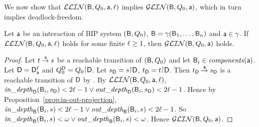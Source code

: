 \vspace{0.5ex}

\noindent
We now show that $\mathcal{LLIN}(\mathsf{B}, Q_0, \mathsf{a}, \ell)$ implies $\mathcal{GLIN}(\mathsf{B}, Q_0, \mathsf{a})$, which in turn implies deadlock-freedom.  

\begin{lemma}
\label{lemma:loc-implies-glob}
\label{lemma:locLinear-implies-globlinear}
\label{LLinGLin}
Let $\mathsf{a}$ be an interaction of BIP system $(\mathsf{B}, Q_0)$, \ie $\mathsf{B} = \gamma(\mathsf{B}_1,\dots,\mathsf{B}_n)$ and $\mathsf{a} \in \gamma$.
If $\mathcal{LLIN}(\mathsf{B}, Q_0, \mathsf{a}, \ell)$ holds for some finite $\ell \ge 1$, then $\mathcal{GLIN}(\mathsf{B}, Q_0, \mathsf{a})$ holds.
\end{lemma}
%
\begin{proof}
Let $t \stackrel{\mathsf{a}}{\rightarrow} s$ be a reachable transition of $(\mathsf{B}, Q_0)$ and let $\mathsf{B}_i \in \mathit{components}(\mathsf{a})$.
Let $\mathsf{D} = \mathsf{D}_{\mathsf{a}}^{\ell}$ and $\QDS = Q_0 \pj \DS$.
Let $\sD = s \pj \DS$, $\tD = t \pj \DS$.
Then $t_\mathsf{D} \stackrel{\mathsf{a}}{\rightarrow} s_\mathsf{D}$ is a reachable transition of $\mathsf{D}$ by .
By $\mathcal{LLIN}(\mathsf{B}, Q_0, \mathsf{a}, \ell)$, 
$\mathit{in\_depth}_{\mathsf{D}}({\mathsf{B}_i, s_\mathsf{D}}) < 2\ell-1 \lor \mathit{out\_depth}_{\mathsf{D}}({\mathsf{B}_i, s_\mathsf{D}}) < 2\ell-1$.
Hence by Proposition~\ref{prop:in-out-projection},
$\mathit{in\_depth}_{\mathsf{B}}({\mathsf{B}_i, s}) < 2\ell-1 \lor \mathit{out\_depth}_{\mathsf{B}}({\mathsf{B}_i, s}) < 2\ell-1$.
So
$\mathit{in\_depth}_{\mathsf{B}}({\mathsf{B}_i, s}) < \omega \lor \mathit{out\_depth}_{\mathsf{B}}({\mathsf{B}_i, s}) < \omega$.
Hence $\mathcal{GLIN}(\mathsf{B}, Q_0, \mathsf{a})$.
\end{proof}








